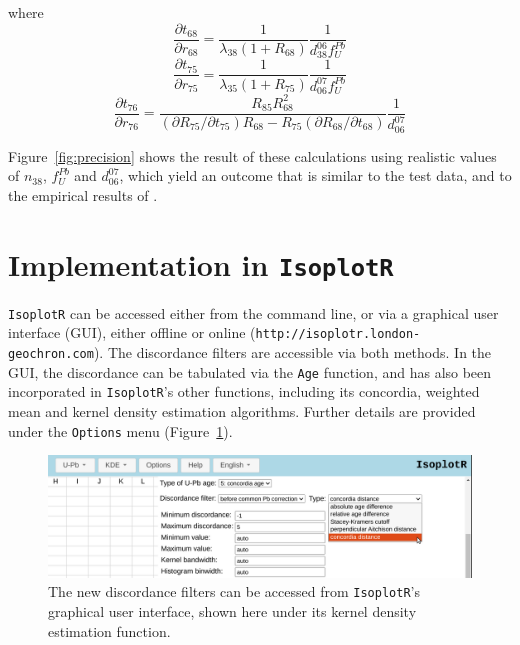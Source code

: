 \documentclass[gchron, manuscript]{copernicus}
\begin{document}
where
\begin{equation}
    \frac{\partial{t_{68}}}{\partial{r_{68}}} = 
    \frac{1}{\lambda_{38}(1+R_{68})} \frac{1}{d^{06}_{38}f^{Pb}_{U}}
\end{equation}
\begin{equation}  
    \frac{\partial{t_{75}}}{\partial{r_{75}}} = 
    \frac{1}{\lambda_{35}(1+R_{75})} \frac{1}{d^{07}_{06}f^{Pb}_{U}}
\end{equation}
\begin{equation}  
  \frac{\partial{t_{76}}}{\partial{r_{76}}} =
  \frac{R_{85}R_{68}^2}
       {(\partial{R_{75}}/\partial{t_{75}})R_{68} -
         R_{75}(\partial{R_{68}}/\partial{t_{68}})}
       \frac{1}{d^{07}_{06}}
\end{equation}

Figure~\ref{fig:precision} shows the result of these calculations
using realistic values of $n_{38}$, $f^{Pb}_{U}$ and $d^{07}_{06}$,
which yield an outcome that is similar to the test data, and to the
empirical results of \citet{zimmermann2018}.

\section{Implementation in \texttt{IsoplotR}}
\label{app:IsoplotR}

\texttt{IsoplotR} can be accessed either from the command line, or via
a graphical user interface (GUI), either offline or online
(\texttt{http://isoplotr.london-geochron.com}).  The discordance
filters are accessible via both methods. In the GUI, the discordance
can be tabulated via the \texttt{Age} function, and has also been
incorporated in \texttt{IsoplotR}'s other functions, including its
concordia, weighted mean and kernel density estimation algorithms.
Further details are provided under the \texttt{Options} menu
(Figure~\ref{fig:IsoplotR}).

\begin{figure}
  \includegraphics[width=12cm]{IsoplotR.png}
  \caption{The new discordance filters can be accessed from
    \texttt{IsoplotR}'s graphical user interface, shown here under its
    kernel density estimation function.}
  \label{fig:IsoplotR}
\end{figure}
\end{document}
